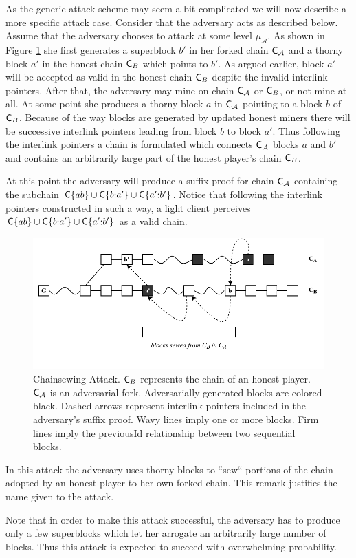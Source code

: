 As the generic attack scheme may seem a bit complicated we will now describe a more specific attack case. Consider that the adversary acts as described below. Assume that the adversary chooses to attack at some level $\mu_\mathcal{A}$. As shown in Figure \ref{fig:attack} she first generates a superblock $b'$ in her forked chain $\mathsf{C}_\mathcal{A}$ and a thorny block $a'$ in the honest chain $\mathsf{C}_B$ which points to $b'$. As argued earlier, block $a'$ will be accepted as valid in the honest chain $\mathsf{C}_B$ despite the invalid interlink pointers. After that, the adversary may mine on chain $\mathsf{C}_\mathcal{A}$ or $\mathsf{C}_B$, or not mine at all. At some point she produces a thorny block $a$ in $\mathsf{C}_\mathcal{A}$ pointing to a block $b$ of $\mathsf{C}_B$. Because of the way blocks are generated by updated honest miners there will be successive interlink pointers leading from block $b$ to block $a'$. Thus following the interlink pointers a chain is formulated which connects $\mathsf{C}_\mathcal{A}$ blocks $a$ and $b'$ and contains an arbitrarily
large part of the honest player's chain $\mathsf{C}_B$.

At this point the adversary will produce a suffix proof for chain $\mathsf{C}_\mathcal{A}$ containing the subchain $\mathsf{C}\{ab\} \cup \mathsf{C}\{b{:}a'\} \cup \mathsf{C}\{a'{:}b'\}$. Notice that following the interlink pointers constructed in such a way, a light client perceives $\mathsf{C}\{ab\} \cup \mathsf{C}\{b{:}a'\} \cup \mathsf{C}\{a'{:}b'\}$  as a valid chain.

\begin{figure}[h!]
	\begin{center}
		\includegraphics[width=\columnwidth]{figures/chainsewing_attack.pdf}
	\end{center}
	\caption{Chainsewing Attack. $\mathsf{C}_B$ represents the chain of an honest player. $\mathsf{C}_\mathcal{A}$ is an adversarial fork. Adversarially generated blocks are colored black. Dashed arrows represent interlink pointers included in the adversary's suffix proof. Wavy lines imply one or more blocks. Firm lines imply the previousId relationship between two sequential blocks.}
	\label{fig:attack}
\end{figure}

In this attack the adversary uses thorny blocks to ``sew`` portions of the chain adopted by an honest player to her own forked chain. This remark justifies the name given to the attack.

Note that in order to make this attack successful, the adversary has to produce only a few superblocks which let her arrogate an arbitrarily large number of blocks. Thus this attack is expected to succeed with overwhelming probability.